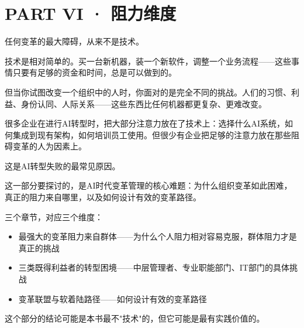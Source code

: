 \part{PART VI · 阻力维度}



任何变革的最大障碍，从来不是技术。

技术是相对简单的。买一台新机器，装一个新软件，调整一个业务流程——这些事情只要有足够的资金和时间，总是可以做到的。

但当你试图改变一个组织中的人时，你面对的是完全不同的挑战。人们的习惯、利益、身份认同、人际关系——这些东西比任何机器都更复杂、更难改变。

很多企业在进行AI转型时，把大部分注意力放在了技术上：选择什么AI系统，如何集成到现有架构，如何培训员工使用。但很少有企业把足够的注意力放在那些阻碍变革的人为因素上。

这是AI转型失败的最常见原因。

这一部分要探讨的，是AI时代变革管理的核心难题：为什么组织变革如此困难，真正的阻力来自哪里，以及如何设计有效的变革路径。

三个章节，对应三个维度：
\begin{itemize}
\item 最强大的变革阻力来自群体——为什么个人阻力相对容易克服，群体阻力才是真正的挑战
\item 三类既得利益者的转型困境——中层管理者、专业职能部门、IT部门的具体挑战
\item 变革联盟与软着陆路径——如何设计有效的变革路径

\end{itemize}
这个部分的结论可能是本书最不"技术"的，但它可能是最有实践价值的。
